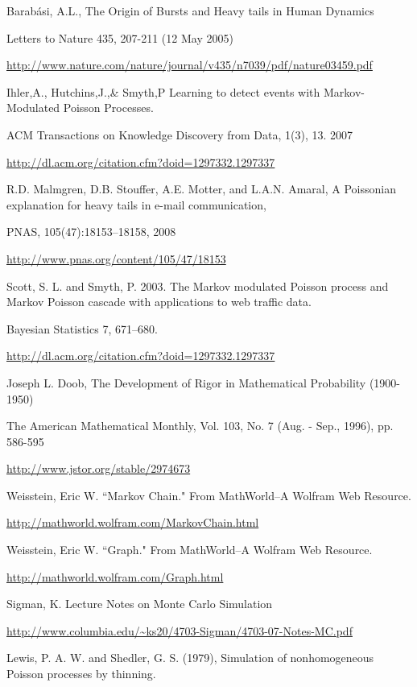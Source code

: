 \documentclass{report}
\begin{document}
\begin{thebibliography}{9}

 Barabási, A.L., The Origin of Bursts and Heavy tails in Human Dynamics

Letters to Nature 435, 207-211 (12 May 2005)

\url{http://www.nature.com/nature/journal/v435/n7039/pdf/nature03459.pdf}

 Ihler,A., Hutchins,J.,\& Smyth,P Learning to detect events with Markov-Modulated Poisson Processes.

ACM Transactions on Knowledge Discovery from Data, 1(3), 13. 2007 

\url{http://dl.acm.org/citation.cfm?doid=1297332.1297337}

 R.D. Malmgren, D.B. Stouffer, A.E. Motter, and L.A.N. Amaral, A Poissonian explanation for heavy tails in e-mail communication, 

PNAS, 105(47):18153–18158, 2008 

\url{http://www.pnas.org/content/105/47/18153}

 Scott, S. L. and Smyth, P. 2003. The Markov modulated Poisson process and Markov Poisson cascade with applications to web traffic data.

Bayesian Statistics 7, 671–680. 

\url{http://dl.acm.org/citation.cfm?doid=1297332.1297337}

	Joseph L. Doob, The Development of Rigor in Mathematical Probability (1900-1950)

	The American Mathematical Monthly, Vol. 103, No. 7 (Aug. - Sep., 1996), pp. 586-595

	\url{http://www.jstor.org/stable/2974673}

	Weisstein, Eric W. ``Markov Chain." From MathWorld--A Wolfram Web Resource. 

	\url{http://mathworld.wolfram.com/MarkovChain.html}

	Weisstein, Eric W. ``Graph." From MathWorld--A Wolfram Web Resource. 
	
	\url{http://mathworld.wolfram.com/Graph.html}

	Sigman, K. Lecture Notes on Monte Carlo Simulation

	\url{http://www.columbia.edu/~ks20/4703-Sigman/4703-07-Notes-MC.pdf}

	Lewis, P. A. W. and Shedler, G. S. (1979), Simulation of nonhomogeneous Poisson processes by thinning.


\end{thebibliography}
\end{document}
